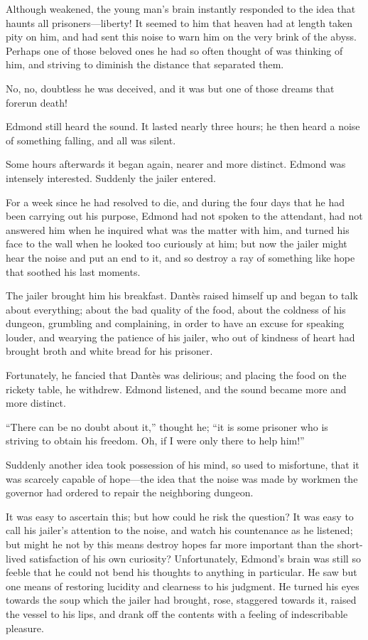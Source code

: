 Although weakened, the young man’s brain instantly responded to the
idea that haunts all prisoners—liberty! It seemed to him that heaven
had at length taken pity on him, and had sent this noise to warn him on
the very brink of the abyss. Perhaps one of those beloved ones he had
so often thought of was thinking of him, and striving to diminish the
distance that separated them.

No, no, doubtless he was deceived, and it was but one of those dreams
that forerun death!

Edmond still heard the sound. It lasted nearly three hours; he then
heard a noise of something falling, and all was silent.

Some hours afterwards it began again, nearer and more distinct. Edmond
was intensely interested. Suddenly the jailer entered.

For a week since he had resolved to die, and during the four days that
he had been carrying out his purpose, Edmond had not spoken to the
attendant, had not answered him when he inquired what was the matter
with him, and turned his face to the wall when he looked too curiously
at him; but now the jailer might hear the noise and put an end to it,
and so destroy a ray of something like hope that soothed his last
moments.

The jailer brought him his breakfast. Dantès raised himself up and
began to talk about everything; about the bad quality of the food,
about the coldness of his dungeon, grumbling and complaining, in order
to have an excuse for speaking louder, and wearying the patience of his
jailer, who out of kindness of heart had brought broth and white bread
for his prisoner.

Fortunately, he fancied that Dantès was delirious; and placing the food
on the rickety table, he withdrew. Edmond listened, and the sound
became more and more distinct.

“There can be no doubt about it,” thought he; “it is some prisoner who
is striving to obtain his freedom. Oh, if I were only there to help
him!”

Suddenly another idea took possession of his mind, so used to
misfortune, that it was scarcely capable of hope—the idea that the
noise was made by workmen the governor had ordered to repair the
neighboring dungeon.

It was easy to ascertain this; but how could he risk the question? It
was easy to call his jailer’s attention to the noise, and watch his
countenance as he listened; but might he not by this means destroy
hopes far more important than the short-lived satisfaction of his own
curiosity? Unfortunately, Edmond’s brain was still so feeble that he
could not bend his thoughts to anything in particular. He saw but one
means of restoring lucidity and clearness to his judgment. He turned
his eyes towards the soup which the jailer had brought, rose, staggered
towards it, raised the vessel to his lips, and drank off the contents
with a feeling of indescribable pleasure.

